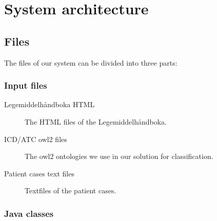 \chapter{System architecture}
\label{cha:architecture}


\section{Files}
\label{sec:files}

The files of our system can be divided into three parts:


\subsection*{Input files} %

\begin{description}
\item[Legemiddelhåndboka HTML]
The HTML files of the Legemiddelhåndboka.

\item[ICD/ATC owl2 files]
The owl2 ontologies we use in our solution for classification.

\item[Patient cases text files]
Textfiles of the patient cases.
\end{description}


\subsection*{Java classes} %


